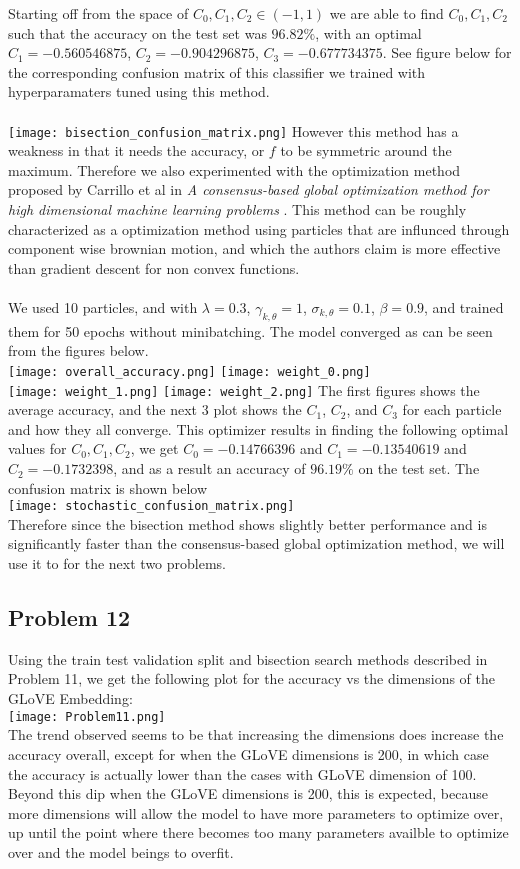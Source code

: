 \documentclass[11pt]{article}
\begin{document}
\begin{multicols}{2}
Starting off from the space of $C_0,C_1,C_2\in (-1,1)$ we are able to find $C_0,C_1,C_2$ such that the accuracy on the test set was $96.82\%$, with an
optimal $C_1=-0.560546875$, $C_2=-0.904296875$, $C_3=-0.677734375$. See figure below for the corresponding confusion matrix of this classifier we trained with hyperparamaters tuned using this method.\\\\
\texttt{[image: bisection\_confusion\_matrix.png]}
However this method has a weakness in that it needs the accuracy, or $f$
to be symmetric around the maximum. Therefore we also experimented with the 
optimization method proposed by Carrillo et al in \textit{A consensus-based global optimization method for high
dimensional machine learning problems
}. This method can be roughly characterized as a optimization method using particles that are influnced through component wise brownian motion, and which the authors claim is more effective than gradient descent for non convex functions.\\\\
We used 10 particles, and with $\lambda=0.3$, $\gamma_{k,\theta}=1$, $\sigma_{k,\theta}=0.1$, $\beta=0.9$, and trained them for 50 epochs without minibatching. The model converged as can be seen from the figures below. \\
\texttt{[image: overall\_accuracy.png]}
\texttt{[image: weight\_0.png]}\\
\texttt{[image: weight\_1.png]}
\texttt{[image: weight\_2.png]}
The first figures shows the average accuracy, and the next 3 plot shows the 
$C_1$, $C_2$, and $C_3$ for each particle and how they all converge. This optimizer results in finding the following optimal values for $C_0,C_1,C_2$,
we get  $C_0=-0.14766396$ and $C_1=-0.13540619$ and $C_2=-0.1732398$, and as a result an accuracy of $96.19\%$ on the test set. The confusion matrix is shown below\\
\texttt{[image: stochastic\_confusion\_matrix.png]}\\
Therefore since the bisection method shows slightly better performance and is significantly faster than the consensus-based global optimization method, we will use it to for the next two problems.
\subsection*{Problem 12}
Using the train test validation split and bisection search methods described in Problem 11, we get the following plot for the accuracy vs the dimensions of the GLoVE Embedding:\\
\texttt{[image: Problem11.png]}\\
The trend observed seems to be that increasing the dimensions does increase the accuracy overall, except for when the GLoVE dimensions is 200, in which case the accuracy is actually lower than the cases with GLoVE dimension of 100. Beyond this dip when the GLoVE dimensions is 200, this is expected, because more dimensions will allow the model to have more parameters to optimize over, up until the point where there becomes too many parameters availble to optimize over and the model beings to overfit.

\end{multicols}
\end{document}
